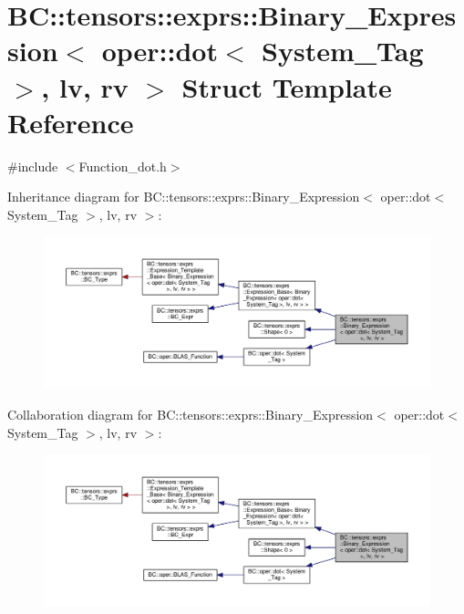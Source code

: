 \hypertarget{structBC_1_1tensors_1_1exprs_1_1Binary__Expression_3_01oper_1_1dot_3_01System__Tag_01_4_00_01lv_00_01rv_01_4}{}\section{BC\+:\+:tensors\+:\+:exprs\+:\+:Binary\+\_\+\+Expression$<$ oper\+:\+:dot$<$ System\+\_\+\+Tag $>$, lv, rv $>$ Struct Template Reference}
\label{structBC_1_1tensors_1_1exprs_1_1Binary__Expression_3_01oper_1_1dot_3_01System__Tag_01_4_00_01lv_00_01rv_01_4}


{\ttfamily \#include $<$Function\+\_\+dot.\+h$>$}



Inheritance diagram for BC\+:\+:tensors\+:\+:exprs\+:\+:Binary\+\_\+\+Expression$<$ oper\+:\+:dot$<$ System\+\_\+\+Tag $>$, lv, rv $>$\+:
\nopagebreak
\begin{figure}[H]
\begin{center}
\leavevmode
\includegraphics[width=350pt]{structBC_1_1tensors_1_1exprs_1_1Binary__Expression_3_01oper_1_1dot_3_01System__Tag_01_4_00_01lv_00_01rv_01_4__inherit__graph}
\end{center}
\end{figure}


Collaboration diagram for BC\+:\+:tensors\+:\+:exprs\+:\+:Binary\+\_\+\+Expression$<$ oper\+:\+:dot$<$ System\+\_\+\+Tag $>$, lv, rv $>$\+:
\nopagebreak
\begin{figure}[H]
\begin{center}
\leavevmode
\includegraphics[width=350pt]{structBC_1_1tensors_1_1exprs_1_1Binary__Expression_3_01oper_1_1dot_3_01System__Tag_01_4_00_01lv_00_01rv_01_4__coll__graph}
\end{center}
\end{figure}
